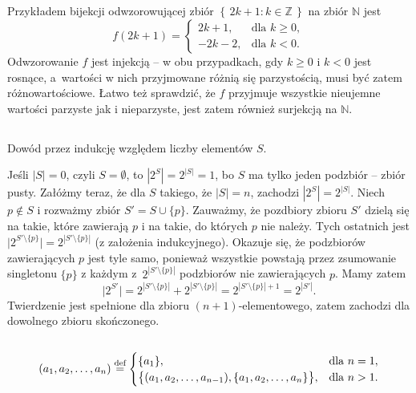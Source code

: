 \subsection{} %
Przykładem bijekcji odwzorowującej zbiór $\left\{\,2k+1:k\in\mathbb{Z}\,\right\}$ na zbiór $\mathbb{N}$ jest
\[
	f(2k+1) =
	\begin{cases}
		2k+1, & \text{dla $k\ge0$}, \\
		-2k-2, & \text{dla $k<0$}.
	\end{cases}
\]
Odwzorowanie $f$ jest injekcją -- w obu przypadkach, gdy $k\ge0$ i $k<0$ jest rosnące, a~wartości w nich przyjmowane różnią się parzystością, musi być zatem różnowartościowe. Łatwo też sprawdzić, że $f$ przyjmuje wszystkie nieujemne wartości parzyste jak i nieparzyste, jest zatem również surjekcją na $\mathbb{N}$.

\subsection{} %
Dowód przez indukcję względem liczby elementów $S$.

Jeśli $|S|=0$, czyli $S=\emptyset$, to $|2^S|=2^{|S|}=1$, bo $S$ ma tylko jeden podzbiór -- zbiór pusty. Załóżmy teraz, że dla $S$ takiego, że $|S|=n$, zachodzi $|2^S|=2^{|S|}$. Niech $p\not\in S$ i rozważmy zbiór $S'=S\cup\{p\}$. Zauważmy, że pozdbiory zbioru $S'$ dzielą się na takie, które zawierają $p$ i na takie, do których $p$ nie należy. Tych ostatnich jest $\bigl|2^{S'\setminus\{p\}}\bigr|=2^{\left|S'\setminus\{p\}\right|}$ (z założenia indukcyjnego). Okazuje się, że podzbiorów zawierających $p$ jest tyle samo, ponieważ wszystkie powstają przez zsumowanie singletonu $\{p\}$ z każdym z~$2^{\left|S'\setminus\{p\}\right|}$ podzbiorów nie zawierających $p$. Mamy zatem
\[
	\bigl|2^{S'}\bigr|=2^{\left|S'\setminus\{p\}\right|}+2^{\left|S'\setminus\{p\}\right|} = 2^{\left|S'\setminus\{p\}\right|+1} = 2^{|S'|}.
\]
Twierdzenie jest spełnione dla zbioru $(n+1)$-elementowego, zatem zachodzi dla dowolnego zbioru skończonego.

\subsection{} %
\[
	(a_1,a_2,\dots,a_n)\stackrel{\text{\scriptsize def}}{=}
	\begin{cases}
		\{a_1\}, & \text{dla $n=1$}, \\
		\bigl\{(a_1,a_2,\dots,a_{n-1}),\{a_1,a_2,\dots,a_n\}\bigr\}, & \text{dla $n>1$}.
	\end{cases}
\]

